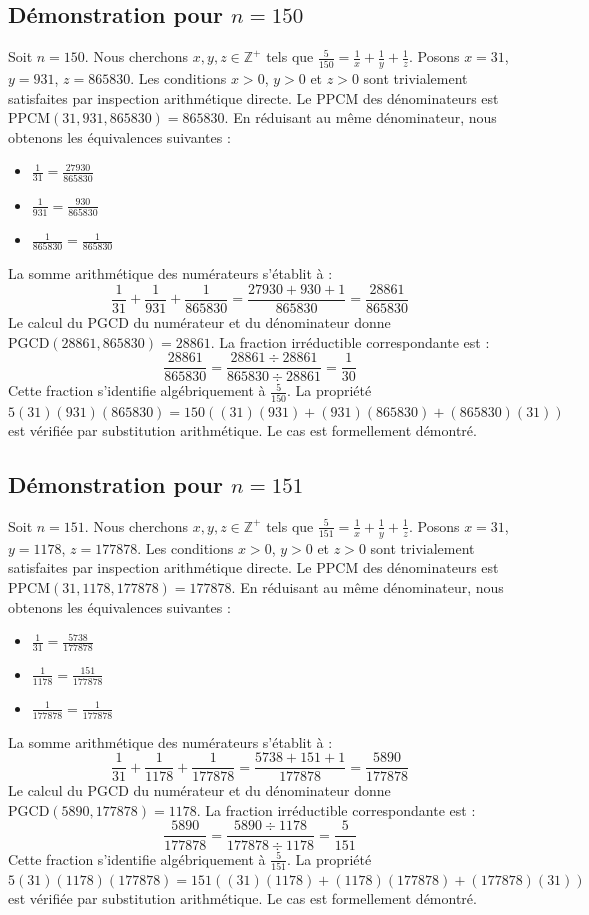 \documentclass[12pt,a4paper]{article}
\begin{document}
\subsection{Démonstration pour $n = 150$}
Soit $n = 150$. Nous cherchons $x, y, z \in \mathbb{Z}^{+}$ tels que $\frac{5}{150} = \frac{1}{x} + \frac{1}{y} + \frac{1}{z}$.
Posons $x = 31$, $y = 931$, $z = 865830$.
Les conditions $x > 0$, $y > 0$ et $z > 0$ sont trivialement satisfaites par inspection arithmétique directe.
Le PPCM des dénominateurs est $\text{PPCM}(31, 931, 865830) = 865830$.
En réduisant au même dénominateur, nous obtenons les équivalences suivantes :
\begin{itemize}
    \item $\frac{1}{31} = \frac{27930}{865830}$
    \item $\frac{1}{931} = \frac{930}{865830}$
    \item $\frac{1}{865830} = \frac{1}{865830}$
\end{itemize}
La somme arithmétique des numérateurs s'établit à :
$$ \frac{1}{31} + \frac{1}{931} + \frac{1}{865830} = \frac{27930 + 930 + 1}{865830} = \frac{28861}{865830} $$
Le calcul du PGCD du numérateur et du dénominateur donne $\text{PGCD}(28861, 865830) = 28861$.
La fraction irréductible correspondante est :
$$ \frac{28861}{865830} = \frac{28861 \div 28861}{865830 \div 28861} = \frac{1}{30} $$
Cette fraction s'identifie algébriquement à $\frac{5}{150}$.
La propriété $5(31)(931)(865830) = 150((31)(931) + (931)(865830) + (865830)(31))$ est vérifiée par substitution arithmétique.
Le cas est formellement démontré.

\subsection{Démonstration pour $n = 151$}
Soit $n = 151$. Nous cherchons $x, y, z \in \mathbb{Z}^{+}$ tels que $\frac{5}{151} = \frac{1}{x} + \frac{1}{y} + \frac{1}{z}$.
Posons $x = 31$, $y = 1178$, $z = 177878$.
Les conditions $x > 0$, $y > 0$ et $z > 0$ sont trivialement satisfaites par inspection arithmétique directe.
Le PPCM des dénominateurs est $\text{PPCM}(31, 1178, 177878) = 177878$.
En réduisant au même dénominateur, nous obtenons les équivalences suivantes :
\begin{itemize}
    \item $\frac{1}{31} = \frac{5738}{177878}$
    \item $\frac{1}{1178} = \frac{151}{177878}$
    \item $\frac{1}{177878} = \frac{1}{177878}$
\end{itemize}
La somme arithmétique des numérateurs s'établit à :
$$ \frac{1}{31} + \frac{1}{1178} + \frac{1}{177878} = \frac{5738 + 151 + 1}{177878} = \frac{5890}{177878} $$
Le calcul du PGCD du numérateur et du dénominateur donne $\text{PGCD}(5890, 177878) = 1178$.
La fraction irréductible correspondante est :
$$ \frac{5890}{177878} = \frac{5890 \div 1178}{177878 \div 1178} = \frac{5}{151} $$
Cette fraction s'identifie algébriquement à $\frac{5}{151}$.
La propriété $5(31)(1178)(177878) = 151((31)(1178) + (1178)(177878) + (177878)(31))$ est vérifiée par substitution arithmétique.
Le cas est formellement démontré.
\end{document}

